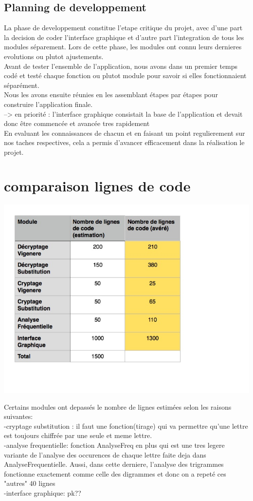 \documentclass[a4]{article}
\begin{document}
		\subsection{Planning de developpement}
		La phase de developpement constitue l’etape critique du projet, avec d’une part la decision de coder l’interface graphique
et d’autre part l’integration de tous les modules séparement. Lors de cette phase, les modules ont connu leurs dernieres evolutions ou plutot ajustements. \\
Avant de tester l’ensemble de l’application, nous avons dans un premier temps codé et
testé chaque fonction ou plutot module pour savoir si elles fonctionnaient séparément. \\
Nous les avons ensuite
réunies en les assemblant étapes par étapes pour construire l’application finale.  \\
--> en priorité : l'interface graphique consistait la base de l'application et devait donc être commencée et avancée tres rapidement \\
En evaluant les connaissances de chacun et en faisant un point regulierement sur nos taches respectives, cela a permis 
d'avancer efficacement dans la réalisation le projet.
	\section{comparaison lignes de code}
		\begin{center}\includegraphics[scale=0.5]{preview.jpg}\end{center}
		Certains modules ont depassés le nombre de lignes estimées selon les raisons suivantes: \\
		-cryptage substitution : il faut une fonction(tirage) qui va permettre qu'une lettre est toujours chiffrée
		 par une seule et meme lettre. \\
		-analyse frequentielle: fonction AnalyseFreq en plus qui est une tres legere variante de l'analyse des occurences de 
		chaque lettre faite deja dans AnalyseFrequentielle. Aussi, dans cette derniere, l'analyse des trigrammes fonctionne exactement
		comme celle des digrammes et donc on a repeté ces "autres" 40 lignes \\
		-interface graphique: pk??
		
\end{document}
